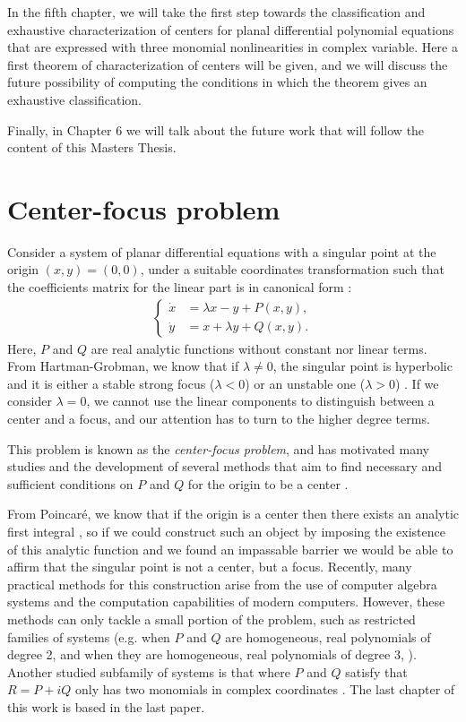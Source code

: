 In the fifth chapter, we will take the first step towards the classification and exhaustive characterization of centers for planal differential polynomial equations that are expressed with three monomial nonlinearities in complex variable. Here a first theorem of characterization of centers will be given, and we will discuss the future possibility of computing the conditions in which the theorem gives an exhaustive classification.

Finally, in Chapter 6 we will talk about the future work that will follow the content of this Masters Thesis.



\section{Center-focus problem}

Consider a system of planar differential equations with a singular point at the origin $(x,y)=(0,0)$, under a suitable coordinates transformation such that the coefficients matrix for the linear part is in canonical form \parencite{Hirsch2004}:
\begin{align}
\begin{cases}
\dot x&=\lambda x-y+P(x,y),\\
\dot y&=x+\lambda y+Q(x,y).
\end{cases}
\label{eq.system.real}
\end{align}
Here, $P$ and $Q$ are real analytic functions without constant nor linear terms. From Hartman-Grobman, we know that if $\lambda\ne0$, the singular point is hyperbolic and it is either a stable strong focus ($\lambda<0$) or an unstable one ($\lambda>0$) \parencite{Hartman1960}. If we consider $\lambda=0$, we cannot use the linear components to distinguish between a center and a focus, and our attention has to turn to the higher degree terms. 

This problem is known as the \emph{center-focus problem}, and has motivated many studies and the development of several methods that aim to find necessary and sufficient conditions on $P$ and $Q$ for the origin to be a center \parencite{Dumortier2006}.

From Poincaré, we know that if the origin is a center then there exists an analytic first integral \parencite{Ilyashenko2006}, so if we could construct such an object by imposing the existence of this analytic function and we found an impassable barrier we would be able to affirm that the singular point is not a center, but a focus. Recently, many practical methods for this construction arise from the use of computer algebra systems and the computation capabilities of modern computers. However, these methods can only tackle a small portion of the problem, such as restricted families of systems (e.g. when $P$ and $Q$ are homogeneous, real polynomials of degree 2,  and when they are homogeneous, real polynomials of degree 3, ). Another studied subfamily of systems is that where $P$ and $Q$ satisfy that $R=P+iQ$ only has two monomials in complex coordinates \parencite{Gasull2016}. The last chapter of this work is based in the last paper.




